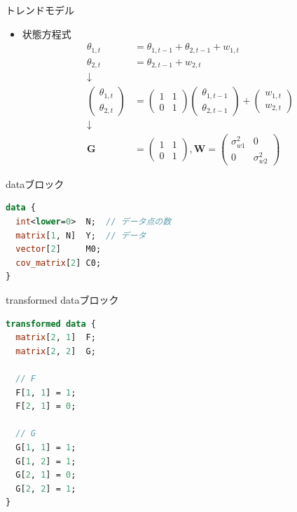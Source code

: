 \documentclass[dvipdfmx,12pt]{beamer}
\begin{document}
\begin{frame}{トレンドモデル}
  \begin{itemize}
  \item 状態方程式
    \begin{align*}
      \theta_{1,t} &= \theta_{1,t-1} + \theta_{2,t-1} + w_{1,t} \\
      \theta_{2,t} &= \theta_{2,t-1} + w_{2,t} \\
      \downarrow \\
      \left(\begin{array}{c}\theta_{1,t} \\ \theta_{2,t}\end{array}\right) &=
      \left(\begin{array}{cc}1 & 1 \\ 0 & 1 \end{array}\right)
      \left(\begin{array}{c}\theta_{1,t-1} \\ \theta_{2,t-1}\end{array}\right) +
      \left(\begin{array}{c}w_{1,t} \\ w_{2,t}\end{array}\right) \\
      \downarrow \\
      \boldsymbol{G} &= \left(\begin{array}{cc}1 & 1 \\ 0 & 1 \end{array}\right),
      \boldsymbol{W} = \left(\begin{array}{cc}\sigma_{w1}^2 & 0\\ 0 & \sigma_{w2}^2\end{array}\right)
    \end{align*}
  \end{itemize}
\end{frame}


\begin{frame}[fragile]{dataブロック}
  \begin{lstlisting}[language=Stan]
data {
  int<lower=0>  N;  // データ点の数
  matrix[1, N]  Y;  // データ
  vector[2]     M0;
  cov_matrix[2] C0;
}
  \end{lstlisting}
\end{frame}

\begin{frame}[fragile]{transformed dataブロック}
  \begin{lstlisting}[language=Stan]
transformed data {
  matrix[2, 1]  F;
  matrix[2, 2]  G;

  // F
  F[1, 1] = 1;
  F[2, 1] = 0;

  // G
  G[1, 1] = 1;
  G[1, 2] = 1;
  G[2, 1] = 0;
  G[2, 2] = 1;
}
  \end{lstlisting}
\end{frame}
\end{document}
